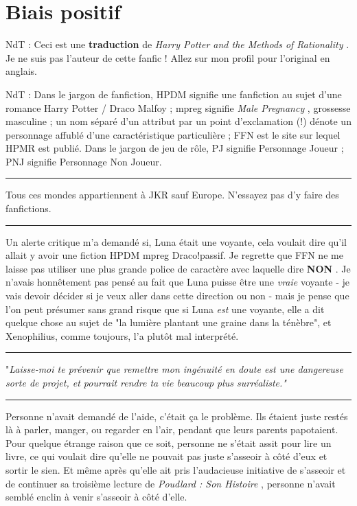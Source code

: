 
\chapter{Biais positif}

NdT : Ceci est une \textbf{traduction}  de \emph{Harry Potter and the Methods of Rationality} . Je ne suis pas l'auteur de cette fanfic ! Allez sur mon profil pour l'original en anglais.

NdT : Dans le jargon de fanfiction, HPDM signifie une fanfiction au sujet d'une romance Harry Potter / Draco Malfoy ; mpreg signifie \emph{Male Pregnancy} , grossesse masculine ; un nom séparé d'un attribut par un point d'exclamation (!) dénote un personnage affublé d'une caractéristique particulière ; FFN est le site sur lequel HPMR est publié. Dans le jargon de jeu de rôle, PJ signifie Personnage Joueur ; PNJ signifie Personnage Non Joueur.
\par\noindent\rule{\textwidth}{0.4pt}
Tous ces mondes appartiennent à JKR sauf Europe. N'essayez pas d'y faire des fanfictions.
\par\noindent\rule{\textwidth}{0.4pt}
Un alerte critique m'a demandé si, Luna était une voyante, cela voulait dire qu'il allait y avoir une fiction HPDM mpreg Draco!passif. Je regrette que FFN ne me laisse pas utiliser une plus grande police de caractère avec laquelle dire \textbf{NON} . Je n'avais honnêtement pas pensé au fait que Luna puisse être une \emph{vraie}  voyante - je vais devoir décider si je veux aller dans cette direction ou non - mais je pense que l'on peut présumer sans grand risque que si Luna \emph{est}  une voyante, elle a dit quelque chose au sujet de "la lumière plantant une graine dans la ténèbre", et Xenophilius, comme toujours, l'a plutôt mal interprété.
\par\noindent\rule{\textwidth}{0.4pt}
"\emph{Laisse-moi te prévenir que remettre mon ingénuité en doute est une dangereuse sorte de projet, et pourrait rendre ta vie beaucoup plus surréaliste."} 
\par\noindent\rule{\textwidth}{0.4pt}
Personne n'avait demandé de l'aide, c'était ça le problème. Ils étaient juste restés là à parler, manger, ou regarder en l'air, pendant que leurs parents papotaient. Pour quelque étrange raison que ce soit, personne ne s'était assit pour lire un livre, ce qui voulait dire qu'elle ne pouvait pas juste s'asseoir à côté d'eux et sortir le sien. Et même après qu'elle ait pris l'audacieuse initiative de s'asseoir et de continuer sa troisième lecture de \emph{Poudlard : Son Histoire} , personne n'avait semblé enclin à venir s'asseoir à côté d'elle.

